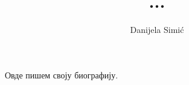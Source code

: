 \documentclass[a4paper,12pt,oneside]{memoir}
\author{Danijela Simić}
\title{...}
\begin{document}
\frontmatter
\naslovna
\naslovnaen
\komisija
\apstrakt
\apstrakten
\tableofcontents*

\mainmatter




\backmatter

\begin{biografija}
Овде пишем своју биографију.
\end{biografija}





\end{document}
